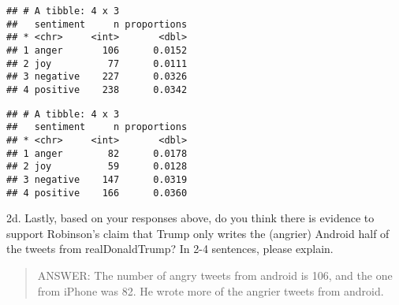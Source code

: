 \documentclass[
]{article}
\newenvironment{Shaded}{\begin{snugshade}}{\end{snugshade}}
\newcommand{\AttributeTok}[1]{\textcolor[rgb]{0.77,0.63,0.00}{#1}}
\newcommand{\CommentTok}[1]{\textcolor[rgb]{0.56,0.35,0.01}{\textit{#1}}}
\newcommand{\FunctionTok}[1]{\textcolor[rgb]{0.00,0.00,0.00}{#1}}
\newcommand{\NormalTok}[1]{#1}
\newcommand{\OtherTok}[1]{\textcolor[rgb]{0.56,0.35,0.01}{#1}}
\newcommand{\SpecialCharTok}[1]{\textcolor[rgb]{0.00,0.00,0.00}{#1}}
\newcommand{\StringTok}[1]{\textcolor[rgb]{0.31,0.60,0.02}{#1}}
\begin{document}
\begin{verbatim}
## # A tibble: 4 x 3
##   sentiment     n proportions
## * <chr>     <int>       <dbl>
## 1 anger       106      0.0152
## 2 joy          77      0.0111
## 3 negative    227      0.0326
## 4 positive    238      0.0342
\end{verbatim}

\begin{Shaded}
\end{Shaded}

\begin{verbatim}
## # A tibble: 4 x 3
##   sentiment     n proportions
## * <chr>     <int>       <dbl>
## 1 anger        82      0.0178
## 2 joy          59      0.0128
## 3 negative    147      0.0319
## 4 positive    166      0.0360
\end{verbatim}

\newpage

2d. Lastly, based on your responses above, do you think there is
evidence to support Robinson's claim that Trump only writes the
(angrier) Android half of the tweets from realDonaldTrump? In 2-4
sentences, please explain.

\begin{quote}
ANSWER: The number of angry tweets from android is 106, and the one from
iPhone was 82. He wrote more of the angrier tweets from android.
\end{quote}
\end{document}
